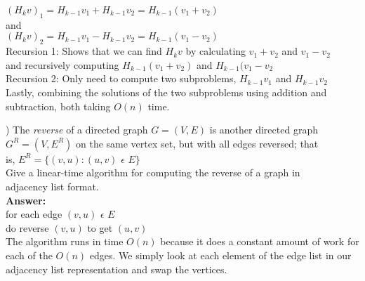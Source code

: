 \documentclass{article}
\begin{document}
\indent \indent \indent $(H_{k}v)_{1} = H_{k - 1}v_{1} + H_{k - 1}v_{2} = H_{k - 1}(v_{1} + v_{2})$ \\
and \\
\indent \indent \indent $(H_{k}v)_{2} = H_{k - 1}v_{1} - H_{k - 1}v_{2} = H_{k - 1}(v_{1} - v_{2})$ \\

Recursion 1: Shows that we can find $H_{k}v$ by calculating $v_{1} + v_{2}$ and $v_{1} - v_{2}$ \\
and recursively computing $H_{k - 1}(v_{1} + v_{2})$ and $H_{k - 1}(v_{1} - v_{2}$ \\

Recursion 2: Only need to compute two subproblems, $H_{k - 1}v_{1}$ and $H_{k - 1}v_{2}$ \\

Lastly, combining the solutions of the two subproblems using addition and subtraction, both taking $O(n)$ time. 

\vspace{.3in}
) The \textit{reverse} of a directed graph $G = (V, E)$ is another directed graph \\
\indent $G^{R} = (V, E^{R})$ on the same vertex set, but with all edges reversed; that \\
\indent is, $E^R =\big\{(v, u) : (u, v)$ $\epsilon$ $E\big\}$ \\

Give a linear-time algorithm for computing the reverse of a graph in \\
adjacency list format. \\
\vspace{.1in}
{\bf Answer:} \\
 for each edge $(v, u)$ $\epsilon$ $E$ \\
 \indent do reverse $(v, u)$ to get $(u, v)$ \\

The algorithm runs in time $O(n)$ because it does a constant amount of work for each of the $O(n)$ edges. We simply look at each element of the edge list in our adjacency list representation and swap the vertices. \\
\end{document}
